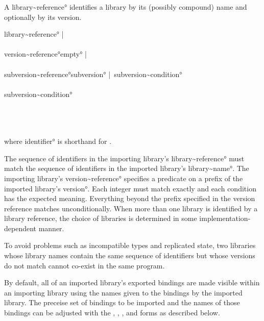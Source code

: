 \documentclass{monograph}
\begin{document}
A \ang{library~reference} identifies a library by its (possibly compound)
name and optionally by its version.

\begin{grammar}
\ang{library~reference}\longis {} \bar\ \\
\\
\ang{version~reference}\longis \ang{empty} \bar\ \\
\\
\ang{subversion~reference}\longis \ang{subversion} \bar\ \ang{subversion~condition}\\
\\
\ang{subversion~condition}\longis {}\\
                           \orbar {}\\
                           \orbar {}\\
                           \orbar {}\\
                           \orbar {}
\end{grammar}

where \ang{identifier} is shorthand for .

The sequence of identifiers in the importing library's
\ang{library~reference} must match the sequence of identifiers in the
imported library's \ang{library~name}.
The importing library's \ang{version~reference} specifies a predicate on a
prefix of the imported library's \ang{version}.
Each integer must match exactly and each condition has the expected meaning.
Everything beyond the prefix specified in the version reference matches
unconditionally.
When more than one library is identified by a library reference, the
choice of libraries is determined in some implementation-dependent manner.

To avoid problems such as incompatible types and replicated state, two
libraries whose library names contain the same sequence of identifiers but
whose versions do not match cannot co-exist in the same program.

By default, all of an imported library's exported bindings are made
visible within an importing library using the names given to the bindings
by the imported library.
The preceise set of bindings to be imported and the names of those
bindings can be adjusted with the , ,
, and  forms as described below.
\end{document}
